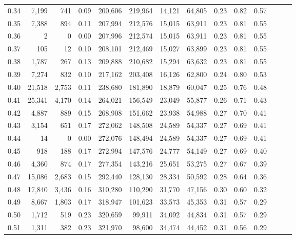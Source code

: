 \begin{tabular}{rrrrrrrrrrrrrr}
0.34 &   7,199 &    741 &  0.09 &  200,606 &  219,964 &  14,121 &  64,805 &  0.23 &  0.82 &      0.57 \\
0.35 &   7,388 &    894 &  0.11 &  207,994 &  212,576 &  15,015 &  63,911 &  0.23 &  0.81 &      0.55 \\
0.36 &       2 &      0 &  0.00 &  207,996 &  212,574 &  15,015 &  63,911 &  0.23 &  0.81 &      0.55 \\
0.37 &     105 &     12 &  0.10 &  208,101 &  212,469 &  15,027 &  63,899 &  0.23 &  0.81 &      0.55 \\
0.38 &   1,787 &    267 &  0.13 &  209,888 &  210,682 &  15,294 &  63,632 &  0.23 &  0.81 &      0.55 \\
0.39 &   7,274 &    832 &  0.10 &  217,162 &  203,408 &  16,126 &  62,800 &  0.24 &  0.80 &      0.53 \\
0.40 &  21,518 &  2,753 &  0.11 &  238,680 &  181,890 &  18,879 &  60,047 &  0.25 &  0.76 &      0.48 \\
0.41 &  25,341 &  4,170 &  0.14 &  264,021 &  156,549 &  23,049 &  55,877 &  0.26 &  0.71 &      0.43 \\
0.42 &   4,887 &    889 &  0.15 &  268,908 &  151,662 &  23,938 &  54,988 &  0.27 &  0.70 &      0.41 \\
0.43 &   3,154 &    651 &  0.17 &  272,062 &  148,508 &  24,589 &  54,337 &  0.27 &  0.69 &      0.41 \\
0.44 &      14 &      0 &  0.00 &  272,076 &  148,494 &  24,589 &  54,337 &  0.27 &  0.69 &      0.41 \\
0.45 &     918 &    188 &  0.17 &  272,994 &  147,576 &  24,777 &  54,149 &  0.27 &  0.69 &      0.40 \\
0.46 &   4,360 &    874 &  0.17 &  277,354 &  143,216 &  25,651 &  53,275 &  0.27 &  0.67 &      0.39 \\
0.47 &  15,086 &  2,683 &  0.15 &  292,440 &  128,130 &  28,334 &  50,592 &  0.28 &  0.64 &      0.36 \\
0.48 &  17,840 &  3,436 &  0.16 &  310,280 &  110,290 &  31,770 &  47,156 &  0.30 &  0.60 &      0.32 \\
0.49 &   8,667 &  1,803 &  0.17 &  318,947 &  101,623 &  33,573 &  45,353 &  0.31 &  0.57 &      0.29 \\
0.50 &   1,712 &    519 &  0.23 &  320,659 &   99,911 &  34,092 &  44,834 &  0.31 &  0.57 &      0.29 \\
0.51 &   1,311 &    382 &  0.23 &  321,970 &   98,600 &  34,474 &  44,452 &  0.31 &  0.56 &      0.29 \\

\end{tabular}
